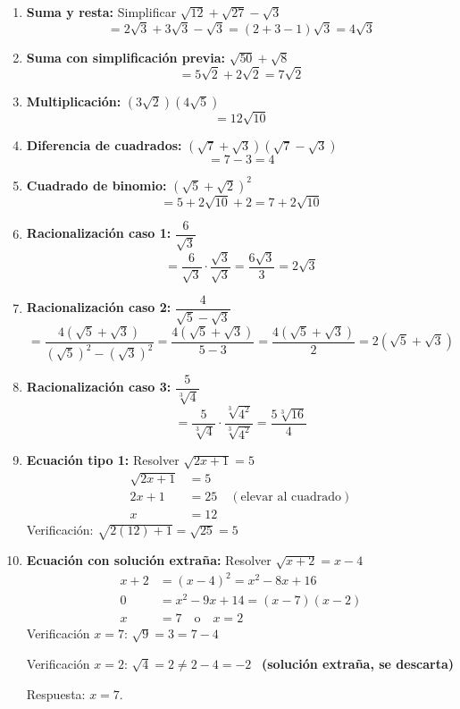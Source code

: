 \documentclass[11pt, letterpaper]{article}
\begin{document}
\begin{tcolorbox}[examplebox, title={Ejemplos}]
\begin{enumerate}[label=\textbf{Ej. \arabic*.}, leftmargin=*]

\item \textbf{Suma y resta:} Simplificar $\sqrt{12}+\sqrt{27}-\sqrt{3}$
$$= 2\sqrt{3}+3\sqrt{3}-\sqrt{3} = (2+3-1)\sqrt{3} = 4\sqrt{3}$$

\item \textbf{Suma con simplificación previa:} $\sqrt{50}+\sqrt{8}$
$$= 5\sqrt{2}+2\sqrt{2} = 7\sqrt{2}$$

\item \textbf{Multiplicación:} $(3\sqrt{2})(4\sqrt{5})$
$$= 12\sqrt{10}$$

\item \textbf{Diferencia de cuadrados:} $(\sqrt{7}+\sqrt{3})(\sqrt{7}-\sqrt{3})$
$$= 7-3 = 4$$

\item \textbf{Cuadrado de binomio:} $(\sqrt{5}+\sqrt{2})^2$
$$= 5+2\sqrt{10}+2 = 7+2\sqrt{10}$$

\item \textbf{Racionalización caso 1:} $\dfrac{6}{\sqrt{3}}$
$$= \frac{6}{\sqrt{3}}\cdot\frac{\sqrt{3}}{\sqrt{3}} = \frac{6\sqrt{3}}{3} = 2\sqrt{3}$$

\item \textbf{Racionalización caso 2:} $\dfrac{4}{\sqrt{5}-\sqrt{3}}$
$$= \frac{4(\sqrt{5}+\sqrt{3})}{(\sqrt{5})^2-(\sqrt{3})^2} = \frac{4(\sqrt{5}+\sqrt{3})}{5-3} = \frac{4(\sqrt{5}+\sqrt{3})}{2} = 2(\sqrt{5}+\sqrt{3})$$

\item \textbf{Racionalización caso 3:} $\dfrac{5}{\sqrt[3]{4}}$
$$= \frac{5}{\sqrt[3]{4}}\cdot\frac{\sqrt[3]{4^2}}{\sqrt[3]{4^2}} = \frac{5\sqrt[3]{16}}{4}$$

\item \textbf{Ecuación tipo 1:} Resolver $\sqrt{2x+1}=5$
\begin{align*}
\sqrt{2x+1} &= 5\\
2x+1 &= 25 \quad (\text{elevar al cuadrado})\\
x &= 12
\end{align*}
Verificación: $\sqrt{2(12)+1}=\sqrt{25}=5$ \checkmark

\item \textbf{Ecuación con solución extraña:} Resolver $\sqrt{x+2} = x-4$
\begin{align*}
x+2 &= (x-4)^2 = x^2-8x+16\\
0 &= x^2-9x+14 = (x-7)(x-2)\\
x &= 7 \quad \text{o} \quad x=2
\end{align*}
Verificación $x=7$: $\sqrt{9}=3=7-4$ \checkmark

Verificación $x=2$: $\sqrt{4}=2\neq 2-4=-2$ \texttimes\ \textbf{(solución extraña, se descarta)}

Respuesta: $x=7$.

\end{enumerate}
\end{tcolorbox}
\end{document}
